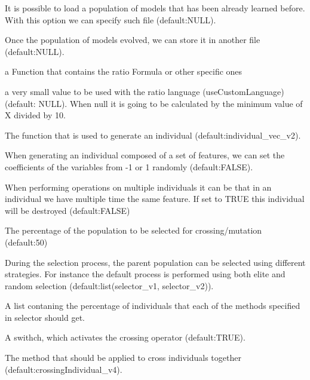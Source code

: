\documentclass[a4paper]{book}
\begin{document}
\begin{Arguments}
\begin{ldescription}
\item[\code{popSourceFile:}] It is possible to load a population of models that has been
already learned before. With this option we can specify such file (default:NULL).

\item[\code{popSaveFile:}] Once the population of models evolved, we can store it in 
another file (default:NULL).

\item[\code{scoreFormula:}] a Function that contains the ratio Formula or other specific ones

\item[\code{epsilon:}] a very small value to be used with the ratio language 
(useCustomLanguage) (default: NULL). When null it is going to be calculated by the 
minimum value of X divided by 10.

\item[\code{individual\_vec:}] The function that is used to generate an individual 
(default:individual\_vec\_v2).

\item[\code{randomSigns:}] When generating an individual composed of a set of features, we 
can set the coefficients of the variables from -1 or 1 randomly (default:FALSE).

\item[\code{unique\_vars:}] When performing operations on multiple individuals it can be 
that in an individual we have multiple time the same feature. If set to TRUE this 
individual will be destroyed (default:FALSE)

\item[\code{select\_perc:}] The percentage of the population to be selected for crossing/mutation 
(default:50)

\item[\code{selector:}] During the selection process, the parent population can be
selected using different strategies. For instance the default process is performed
using both elite and random selection (default:list(selector\_v1, selector\_v2)).

\item[\code{select\_percByMethod:}] A list contaning the percentage of individuals that
each of the methods specified in selector should get.

\item[\code{cross:}] A swithch, which activates the crossing operator (default:TRUE).

\item[\code{crosser:}] The method that should be applied to cross individuals
together (default:crossingIndividual\_v4).


\end{ldescription}
\end{Arguments}
\end{document}
